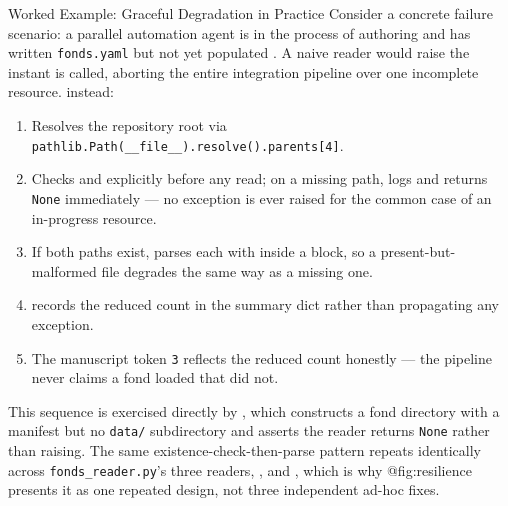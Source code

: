 \documentclass[
  ignorenonframetext,
]{beamer}
\providecommand{\tightlist}{%
  \setlength{\itemsep}{0pt}\setlength{\parskip}{0pt}}
\begin{document}
\begin{frame}{Worked Example: Graceful
Degradation in Practice}
\protect{}\label{worked-example-graceful-degradation-in-practice}
Consider a concrete failure scenario: a parallel automation agent is in
the process of authoring 
and has written \texttt{fonds.yaml} but not yet populated
. A naive reader would raise
 the instant 
is called, aborting the entire integration pipeline over one incomplete
resource.  instead:

\begin{enumerate}
\tightlist
\item
  Resolves the repository root via
  \texttt{pathlib.Path(\_\_file\_\_).resolve().parents{[}4{]}}.
\item
  Checks  and
   explicitly before any read; on a
  missing path, logs
   and
  returns \texttt{None} immediately --- no exception is ever raised for
  the common case of an in-progress resource.
\item
  If both paths exist, parses each with 
  inside a
  block, so a present-but-malformed file degrades the same way as a
  missing one.
\item
   records the reduced count in the
  summary dict rather than propagating any exception.
\item
  The manuscript token \texttt{3} reflects the reduced count honestly
  --- the pipeline never claims a fond loaded that did not.
\end{enumerate}

This sequence is exercised directly by
,
which constructs a fond directory with a manifest but no \texttt{data/}
subdirectory and asserts the reader returns \texttt{None} rather than
raising. The same existence-check-then-parse pattern repeats identically
across \texttt{fonds\_reader.py}'s three readers,
, and , which is why
@fig:resilience presents it as one repeated design, not three
independent ad-hoc fixes.
\end{frame}
\end{document}
